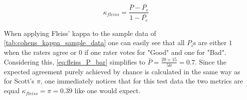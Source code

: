 \begin{equation}\label{eq:fleiss_kappa}
    \kappa_{fleiss} = \frac{\bar{P}-\bar{P_e}}{1-\bar{P_e}}
\end{equation}

When applying Fleiss' kappa to the sample data of \cref{tab:cohens_kappa_sample_data} one can easily see that all $P_i$s are either $1$ when the raters agree or $0$ if one rater votes for "Good" and one for "Bad".
Considering this, \cref{eq:fleiss_P_bar} simplifies to $\bar{P} = \frac{20+15}{50} = 0.7$.
Since the expected agreement purely achieved by chance is calculated in the same way as for Scott's $\pi$, one immediately notices that for this test data the two metrics are equal $\kappa_{fleiss} = \pi = 0.\overline{39}$ like one would expect.
